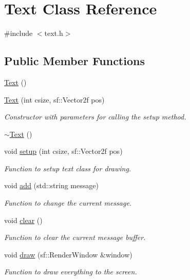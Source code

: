 \hypertarget{class_text}{}\section{Text Class Reference}
\label{class_text}


{\ttfamily \#include $<$text.\+h$>$}

\subsection*{Public Member Functions}
\begin{DoxyCompactItemize}
\item 
\hyperlink{class_text_ab3e26143fccc52699bcc5149cae852bc}{Text} ()
\item 
\hyperlink{class_text_acf28836e4c129f524d6dc18963ed2391}{Text} (int csize, sf\+::\+Vector2f pos)
\begin{DoxyCompactList}\small\item\em Constructor with parameters for calling the setup method. \end{DoxyCompactList}\item 
\hyperlink{class_text_a2d49e5c280e205125b149f7777ae30c7}{$\sim$\+Text} ()
\item 
void \hyperlink{class_text_afde89d05e0de0f17092b8c56e6ac77df}{setup} (int csize, sf\+::\+Vector2f pos)
\begin{DoxyCompactList}\small\item\em Function to setup text class for drawing. \end{DoxyCompactList}\item 
void \hyperlink{class_text_ab5f6fabb3e5e029ed0e42d21757c9521}{add} (std\+::string message)
\begin{DoxyCompactList}\small\item\em Function to change the current message. \end{DoxyCompactList}\item 
void \hyperlink{class_text_a7dacbbf887593bff5a5e45cde06dca71}{clear} ()
\begin{DoxyCompactList}\small\item\em Function to clear the current message buffer. \end{DoxyCompactList}\item 
void \hyperlink{class_text_a820f51d1ef58aa6ffadc10cc0e6ce479}{draw} (sf\+::\+Render\+Window \&window)
\begin{DoxyCompactList}\small\item\em Function to draw everything to the screen. \end{DoxyCompactList}\end{DoxyCompactItemize}


